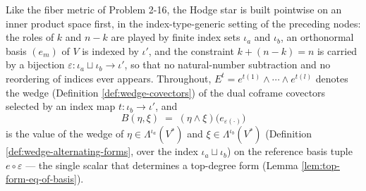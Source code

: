 Like the fiber metric of Problem 2-16, the Hodge star is built pointwise on an inner product space first, in the index-type-generic setting of the preceding nodes: the roles of $k$ and $n-k$ are played by finite index sets $\iota_a$ and $\iota_b$, an orthonormal basis $(e_m)$ of $V$ is indexed by $\iota'$, and the constraint $k + (n-k) = n$ is carried by a bijection $\varepsilon \colon \iota_a \sqcup \iota_b \to \iota'$, so that no natural-number subtraction and no reordering of indices ever appears. Throughout, $E^t = e^{t(1)} \wedge \cdots \wedge e^{t(l)}$ denotes the wedge (Definition \ref{def:wedge-covectors}) of the dual coframe covectors selected by an index map $t \colon \iota_b \to \iota'$, and
\[
B(\eta, \xi) \;=\; (\eta \wedge \xi)\big(e_{\varepsilon(\cdot)}\big)
\]
is the value of the wedge of $\eta \in \Lambda^{\iota_a}(V^*)$ and $\xi \in \Lambda^{\iota_b}(V^*)$ (Definition \ref{def:wedge-alternating-forms}, over the index $\iota_a \sqcup \iota_b$) on the reference basis tuple $e \circ \varepsilon$ --- the single scalar that determines a top-degree form (Lemma \ref{lem:top-form-eq-of-basis}).

